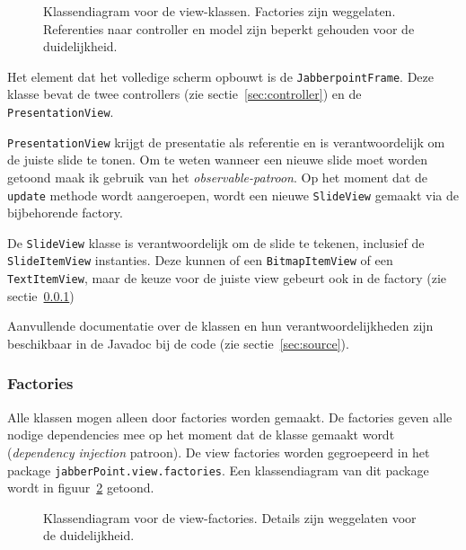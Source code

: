 \documentclass[a4paper]{article}
\newcommand{\code}[1]{\lstinline[columns=fixed]{#1}}
\newcommand{\diagram}[3][1.3]{
	\begin{figure}[!htb]
	 \caption{#3}
	 \label{diagram:#2}
	 \makebox[\textwidth][c]{\texttt{[image: Diagrams/\#2.pdf]}}%
	\end{figure}
}
\begin{document}
		\diagram[1]{view}{
			Klassendiagram voor de view-klassen.
			Factories zijn weggelaten.
			Referenties naar controller en model zijn beperkt gehouden voor de duidelijkheid.
		}

		Het element dat het volledige scherm opbouwt is de \code{JabberpointFrame}.
		Deze klasse bevat de twee controllers (zie sectie~\ref{sec:controller}) en de \code{PresentationView}.

		\code{PresentationView} krijgt de presentatie als referentie en is verantwoordelijk om de juiste slide te tonen.
		Om te weten wanneer een nieuwe slide moet worden getoond maak ik gebruik van het \textit{observable-patroon}.
		Op het moment dat de \code{update} methode wordt aangeroepen, wordt een nieuwe \code{SlideView} gemaakt via de bijbehorende factory.

		De \code{SlideView} klasse is verantwoordelijk om de slide te tekenen, inclusief de \code{SlideItemView} instanties.
		Deze kunnen of een \code{BitmapItemView} of een \code{TextItemView}, maar de keuze voor de juiste view gebeurt ook in de factory (zie sectie~\ref{sec:view-factories})

		Aanvullende documentatie over de klassen en hun verantwoordelijkheden zijn beschikbaar in de Javadoc bij de code (zie sectie~\ref{sec:source}).

		\subsubsection{Factories}\label{sec:view-factories}
			Alle klassen mogen alleen door factories worden gemaakt.
			De factories geven alle nodige dependencies mee op het moment dat de klasse gemaakt wordt (\textit{dependency injection} patroon).
			De view factories worden gegroepeerd in het package \code{jabberPoint.view.factories}.
			Een klassendiagram van dit package wordt in figuur~\ref{diagram:view-factories} getoond.

			\begin{figure}[!htb]
			 \caption{
				Klassendiagram voor de view-factories.\label{diagram:view-factories}
				Details zijn weggelaten voor de duide\-lijk\-heid.
			 }
			\end{figure}
\end{document}
